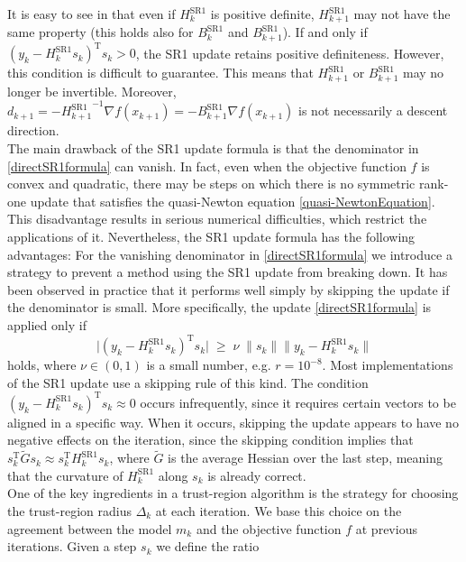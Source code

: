 It is easy to see in that even if $H^\mathrm{SR1}_k$ is positive definite, $H^\mathrm{SR1}_{k+1}$ may not have the same property (this holds also for $B^\mathrm{SR1}_k$ and $B^\mathrm{SR1}_{k+1}$). If and only if $(y_k - H^\mathrm{SR1}_k s_k)^{\mathrm{T}} s_k > 0$, the SR1 update retains positive definiteness. However, this condition is difficult to guarantee. This means that $H^\mathrm{SR1}_{k+1}$ or $B^\mathrm{SR1}_{k+1}$ may no longer be invertible. Moreover, $d_{k+1} = -{H^\mathrm{SR1}_{k+1}}^{-1} \nabla f(x_{k+1}) = -B^\mathrm{SR1}_{k+1} \nabla f(x_{k+1})$ is not necessarily a descent direction. \\
The main drawback of the SR1 update formula is that the denominator in \cref{directSR1formula} can vanish. In fact, even when the objective function $f$ is convex and quadratic, there may be steps on which there is no symmetric rank-one update that satisfies the quasi-Newton equation \cref{quasi-NewtonEquation}. This disadvantage results in serious numerical difficulties, which restrict the applications of it. Nevertheless, the SR1 update formula has the following advantages:
For the vanishing denominator in \cref{directSR1formula} we introduce a strategy to prevent a method using the SR1 update from breaking down. It has been observed in practice that it performs well simply by skipping the update if the denominator is small. More specifically, the update \cref{directSR1formula} is applied only if 
\begin{equation}\label{safeguard}
    \lvert (y_k - H^\mathrm{SR1}_k s_k)^{\mathrm{T}} s_k \lvert \; \geq \; \nu \; \lVert s_k \rVert \lVert y_k - H^\mathrm{SR1}_k s_k \rVert 
\end{equation}
holds, where $\nu \in (0, 1)$ is a small number, e.g. $r = 10^{−8}$. Most implementations of the SR1 update use a skipping rule of this kind. The condition $(y_k - H^\mathrm{SR1}_k s_k)^{\mathrm{T}} s_k \approx 0$ occurs infrequently, since it requires certain vectors to be aligned in a specific way. When it occurs, skipping the update appears to have no negative effects on the iteration, since the skipping condition implies that $s^{\mathrm{T}}_k \tilde{G} s_k \approx s^{\mathrm{T}}_k H^\mathrm{SR1}_k s_k$, where $\tilde{G}$ is the average Hessian over the last step, meaning that the curvature of $H^\mathrm{SR1}_k$ along $s_k$ is already correct. \\





One of the key ingredients in a trust-region algorithm is the strategy for choosing the trust-region radius $\Delta_k$ at each iteration. We base this choice on the agreement between the model $m_k$ and the objective function $f$ at previous iterations. Given a step $s_k$ we define the ratio

